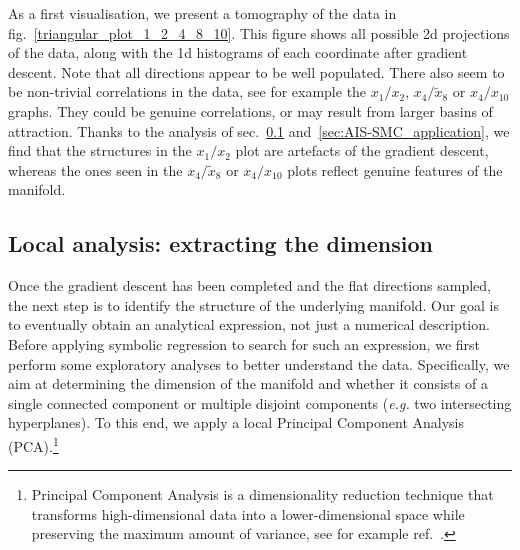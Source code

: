 \documentclass[11pt,a4paper]{article}
\begin{document}
	As a first visualisation, we present a tomography of the data in fig.~\ref{triangular_plot_1_2_4_8_10}. This figure shows all possible 2d projections of the data, along with the 1d histograms of each coordinate after gradient descent. Note that all directions appear to be well populated. There also seem to be non-trivial correlations in the data, see for example the $x_1/x_2$, $x_4/\tilde{x}_8$ or $x_4/x_{10}$ graphs. They could be genuine correlations, or may result from larger basins of attraction. Thanks to the analysis of sec.~\ref{sec:localanalysis} and~\ref{sec:AIS-SMC_application}, we find that the structures in the $x_1/x_2$ plot are artefacts of the gradient descent, whereas the ones seen in the $x_4/\tilde{x}_8$ or $x_4/x_{10}$ plots reflect genuine features of the manifold. 

	\subsection{Local analysis: extracting the dimension} \label{sec:localanalysis}
	Once the gradient descent has been completed and the flat directions sampled, the next step is to identify the structure of the underlying manifold. Our goal is to eventually obtain an analytical expression, not just a numerical description. Before applying symbolic regression to search for such an expression, we first perform some exploratory analyses to better understand the data. Specifically, we aim at determining the dimension of the manifold and whether it consists of a single connected component or multiple disjoint components (\textit{e.g.} two intersecting hyperplanes). To this end, we apply a local Principal Component Analysis (PCA).\footnote{Principal Component Analysis is a dimensionality reduction technique that transforms high-dimensional data into a lower-dimensional space while preserving the maximum amount of variance, see for example ref.~\cite{scikit-learn}.} %
\end{document}
